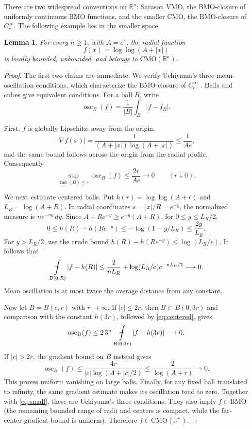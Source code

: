 \documentclass[11pt]{article}
\newtheorem{lemma}[theorem]{Lemma}
\newcommand{\R}{\mathbb R}
\newcommand{\BMO}{\mathrm{BMO}}
\newcommand{\CMO}{\mathrm{CMO}}
\newcommand{\MO}{\operatorname{osc}}
\newcommand{\fint}{\mathop{\rlap{\raisebox{0.15ex}{\ensuremath{-}}}\!\int}}
\begin{document}
There are two widespread conventions on $\R^n$: Sarason VMO, the
$\BMO$-closure of uniformly continuous BMO functions, and the smaller
$\CMO$, the $\BMO$-closure of $C_c^\infty$.  The following example lies in
the smaller space.

\begin{lemma}\label{lem:cmo}
For every $n\geq1$, with $A=e^e$, the radial function
\begin{equation}\label{eq:f}
 f(x)=\log\log(A+|x|)
\end{equation}
is locally bounded, unbounded, and belongs to $\CMO(\R^n)$.
\end{lemma}

\begin{proof}
The first two claims are immediate.  We verify Uchiyama's three
mean-oscillation conditions, which characterize the $\BMO$-closure of
$C_c^\infty$ \cite{Uchiyama}.  Balls and cubes give equivalent conditions.
For a ball $B$, write
\[
 \MO_B(f)=\frac1{|B|}\int_B|f-f_B|.
\]

First, $f$ is globally Lipschitz: away from the origin,
\[
 |\nabla f(x)|=
 \frac1{(A+|x|)\log(A+|x|)}\leq\frac1{Ae},
\]
and the same bound follows across the origin from the radial profile.
Consequently
\begin{equation}\label{eq:small}
 \sup_{\operatorname{rad}(B)\leq r}\MO_B(f)\leq\frac{2r}{Ae}\to0
 \qquad(r\downarrow0).
\end{equation}

We next estimate centered balls.  Put $h(r)=\log\log(A+r)$ and
$L_R=\log(A+R)$.  In radial coordinates $s=|x|/R=e^{-y}$,
the normalized measure is $n e^{-ny}\,dy$.  Since
$A+Re^{-y}\geq e^{-y}(A+R)$, for $0\leq y\leq L_R/2$,
\[
 0\leq h(R)-h(Re^{-y})
 \leq-\log(1-y/L_R)\leq\frac{2y}{L_R}.
\]
For $y>L_R/2$, use the crude bound
$h(R)-h(Re^{-y})\leq\log(L_R/e)$.  It follows that
\begin{equation}\label{eq:centered}
 \fint_{B(0,R)}|f-h(R)|
 \leq \frac{2}{nL_R}+\log(L_R/e)e^{-nL_R/2}\longrightarrow0.
\end{equation}
Mean oscillation is at most twice the average distance from any constant.

Now let $B=B(c,r)$ with $r\to\infty$.  If $|c|\leq2r$, then
$B\subset B(0,3r)$ and comparison with the constant $h(3r)$, followed by
\eqref{eq:centered}, gives
\[
 \MO_B(f)\leq 2\,3^n\fint_{B(0,3r)}|f-h(3r)|\longrightarrow0.
\]
If $|c|>2r$, the gradient bound on $B$ instead gives
\[
 \MO_B(f)\leq
 \frac{4r}{|c|\log(A+|c|/2)}
 \leq\frac{2}{\log(A+r)}\longrightarrow0.
\]
This proves uniform vanishing on large balls.  Finally, for any fixed ball
translated to infinity, the same gradient estimate makes its oscillation
tend to zero.  Together with \eqref{eq:small}, these are Uchiyama's three
conditions.  They also imply $f\in\BMO$ (the remaining bounded range of
radii and centers is compact, while the far-center gradient bound is
uniform).  Therefore $f\in\CMO(\R^n)$.
\end{proof}
\end{document}
